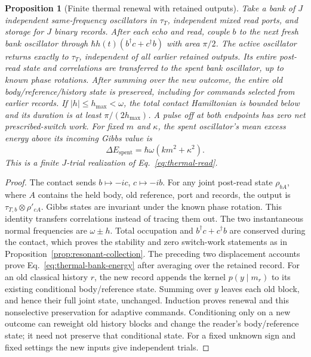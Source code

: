 \documentclass[aps,pre,onecolumn,superscriptaddress,floatfix,longbibliography]{revtex4-2}
\newtheorem{proposition}[theorem]{Proposition}
\begin{document}
\begin{proposition}[Finite thermal renewal with retained outputs]
\label{prop:thermal-renewal}
Take a bank of $J$ independent same-frequency oscillators in $\tau_T$,
independent mixed read ports, and storage for $J$ binary records.
After each echo and read, couple $b$ to the next fresh bank oscillator
through $\hbar h(t)(b^\dagger c+c^\dagger b)$ with area $\pi/2$.
The active oscillator returns exactly to $\tau_T$, independent of all
earlier retained outputs. Its entire post-read state and correlations
are transferred to the spent bank oscillator, up to known phase rotations.
After summing over the new outcome, the entire old body/reference/history
state is preserved, including for commands selected from earlier records.
If $|h|\le h_{\max}<\omega$, the total
contact Hamiltonian is bounded below and its duration is at least
$\pi/(2h_{\max})$. A pulse off at both endpoints has zero net
prescribed-switch work. For fixed $m$ and $\kappa$, the spent oscillator's
mean excess energy above its incoming Gibbs value is
\begin{equation}\label{eq:thermal-bank-energy}
 \Delta E_{\mathrm{spent}}=\hbar\omega(km^2+\kappa^2).
\end{equation}
This is a finite $J$-trial realization of Eq.~\eqref{eq:thermal-read}.
\end{proposition}
\begin{proof}
The contact sends $b\mapsto-ic$, $c\mapsto-ib$.
For any joint post-read state $\rho_{bA}$, where $A$ contains the held
body, old reference, port and records, the output is
$\tau_{T,b}\otimes\rho'_{cA}$. Gibbs states are invariant under the known
phase rotation. This identity transfers correlations instead of tracing
them out. The two instantaneous normal frequencies are $\omega\pm h$.
Total occupation and $b^\dagger c+c^\dagger b$ are conserved during the
contact, which proves the stability and zero switch-work statements as in
Proposition~\ref{prop:resonant-collection}. The preceding two displacement
accounts prove Eq.~\eqref{eq:thermal-bank-energy} after averaging over
the retained record. For an old classical history $r$, the new record
appends the kernel $p(y\mid m_r)$ to its existing conditional
body/reference state. Summing over $y$ leaves each old block, and hence
their full joint state, unchanged. Induction proves renewal and this
nonselective preservation for adaptive commands. Conditioning only on a
new outcome can reweight old history blocks and change the reader's
body/reference state; it need not preserve that conditional state.
For a fixed unknown sign and fixed settings the new inputs give
independent trials.
\end{proof}
\end{document}
